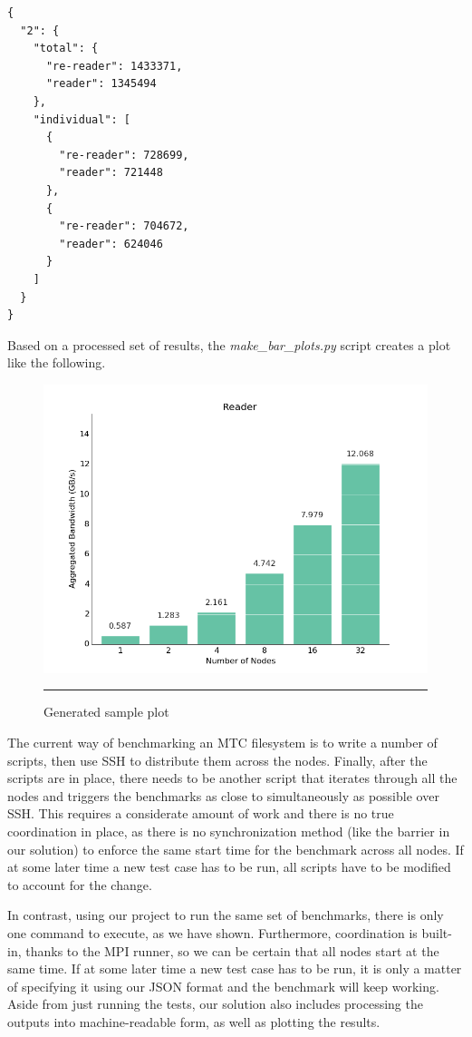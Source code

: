 \begin{verbatim}
{
  "2": {
    "total": {
      "re-reader": 1433371, 
      "reader": 1345494
    }, 
    "individual": [
      {
        "re-reader": 728699, 
        "reader": 721448
      }, 
      {
        "re-reader": 704672, 
        "reader": 624046
      }
    ]
  }
}
\end{verbatim}

Based on a processed set of results, the \textit{make\_bar\_plots.py} script creates a plot like the following.

\begin{figure}[H]
  \centering
    \includegraphics[scale=0.5]{Figures/reader.png}
    \rule{25em}{0.5pt}
  \caption[Generated sample plot]{Generated sample plot}
  \label{fig:architecture}
\end{figure}

The current way of benchmarking an MTC filesystem is to write a number of scripts, then use SSH to distribute them across the nodes. Finally, after the scripts are in place, there needs to be another
script that iterates through all the nodes and triggers the benchmarks as close to simultaneously as possible over SSH. This requires a considerate amount of work and there is no true coordination in place, as there is no synchronization method (like the barrier in our solution) to enforce the same start time for the benchmark across all nodes. If at some later time a new test case has to be run, all scripts have to be modified to account for the change.

In contrast, using our project to run the same set of benchmarks, there is only one command to execute, as we have shown. Furthermore, coordination is built-in, thanks to the MPI runner, so we can be certain that all nodes start at the same time. If at some later time a new test case has to be run, it is only a matter of specifying it using our JSON format and the benchmark will keep working. Aside from just running the tests, our solution also includes processing the outputs into machine-readable form, as well as plotting the results.
